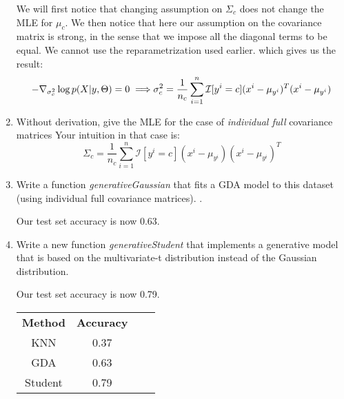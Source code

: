 \documentclass{article}
\begin{document}
\begin{enumerate}
 We will first notice that changing assumption on $\Sigma_c$ does not change the MLE for $\mu_c$.
 We then notice that here our assumption on the covariance matrix is strong, in the sense that we impose all the diagonal terms to be equal. We cannot use the reparametrization used earlier.
 which gives us the result:
  \[
 - \nabla_{\sigma_c^2} \log p(X|y,\Theta) = 0 \implies \\
 \sigma_c^2 = \frac{1}{n_c} \sum_{i=1}^n \mathcal{I}[y^i=c] (x^i - \mu_{y^i})^T(x^i - \mu_{y^i})
 \]
 \item Without derivation, give the MLE for the case of \emph{individual full} covariance matrices
 Your intuition in that case is:
 \[
 \Sigma_c = \frac{1}{n_c} \sum_{i=1}^n \mathcal{I}[y^i=c] (x^i - \mu_{y^i})(x^i - \mu_{y^i})^T
 \]
 \item  Write a function \emph{generativeGaussian} that fits a GDA model to this dataset (using individual full covariance matrices). .

 

 Our test set accuracy is now 0.63.
 \item Write a new function \emph{generativeStudent} that implements a generative model that is based on the multivariate-t distribution instead of the Gaussian distribution.  
 

 Our test set accuracy is now 0.79.

 \begin{tabular}[h]{cccc}
  \textbf{Method} & \textbf{Accuracy}\\
  KNN & 0.37\\
  GDA & 0.63\\
  Student & 0.79
\end{tabular}

\end{enumerate}
\end{document}
